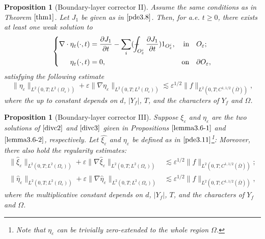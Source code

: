 \documentclass[13pt,CJK]{article}
\theoremstyle{plain}                       %
\newtheorem{proposition}[lemma]{Proposition}
\theoremstyle{remark}
\numberwithin{equation}{section}
\def\Xint#1{\mathchoice
  {\XXint\displaystyle\textstyle{#1}}%
  {\XXint\textstyle\scriptstyle{#1}}%
  {\XXint\scriptstyle\scriptscriptstyle{#1}}%
  {\XXint\scriptscriptstyle\scriptscriptstyle{#1}}%
  \!\int}
\def\XXint#1#2#3{{\setbox0=\hbox{$#1{#2#3}{\int}$}
  \vcenter{\hbox{$#2#3$}}\kern-.5\wd0}}
\def\dashint{\Xint-}
\begin{document}
\begin{proposition}[Boundary-layer corrector II]\label{lemma3.6-2}
Assume the same conditions as in Theorem $\ref{thm1}$.
Let $J_1$ be given as in $\eqref{pde3.8}$. Then,
for a.e. $t\geq 0$,  there exists at least
one weak solution to
\begin{equation}\label{divc3}
\left\{
\begin{aligned}
\nabla\cdot\eta_{\varepsilon}(\cdot,t)&=\frac{\partial J_1}{\partial t} -\sum_{i} (\dashint_{O_{\varepsilon}^i}\frac{\partial J_1}{\partial t})1_{O_{\varepsilon}^i},&
\text{in}&\quad O_{\varepsilon};\\
\eta_{\varepsilon}(\cdot,t)&=0,&\text{on}&\quad \partial O_{\varepsilon},
\end{aligned}\right.
\end{equation}
satisfying the following estimate
\begin{equation}\label{pri:5.2}
 \|\eta_{\varepsilon}\|_{L^2(0,T;L^2(\Omega_\varepsilon))}
 + \varepsilon\|\nabla\eta_{\varepsilon}\|_{L^2(0,T;L^2(\Omega_\varepsilon))}
 \lesssim \varepsilon^{1/2}\|f\|_{L^2(0,T;C^{1,1/2}(\bar{\Omega}))},
\end{equation}
where the up to constant depends on $d$, $|Y_f|$, $T$, and the characters of $Y_f$ and $\Omega$.
\end{proposition}


\begin{proposition}[Boundary-layer corrector III]\label{lemma3.6-3}
Suppose $\xi_{\varepsilon}$ and $\eta_{\varepsilon}$ are the two solutions of $\eqref{divc2}$ and $\eqref{divc3}$ given in Propositions $\ref{lemma3.6-1}$ and $\ref{lemma3.6-2}$, respectively.
Let $\hat{\xi_{\varepsilon}}$ and $\hat{\eta_{\varepsilon}}$ be defined as in $\eqref{pde3.11}$\footnote{Note that
$\eta_{\varepsilon}$ can be trivially zero-extended to the whole region $\Omega$.}:
Moreover, there also hold the regularity estimates:
\begin{subequations}
\begin{align}
\|\hat\xi_{\varepsilon}\|_{L^2(0,T;L^2(\Omega_\varepsilon))}
+ \varepsilon\|\nabla\hat\xi_{\varepsilon}\|_{L^2(0,T;L^2(\Omega_\varepsilon))}
&\lesssim \varepsilon^{1/2}\|f\|_{L^2(0,T;C^{1,1/2}(\bar\Omega))}; \label{pri:5.3a} \\
\|\hat\eta_{\varepsilon}\|_{L^2(0,T;L^2(\Omega_\varepsilon))}
+ \varepsilon\|\nabla\hat\eta_{\varepsilon}\|_{L^2(0,T;L^2(\Omega_\varepsilon))}
&\lesssim \varepsilon^{1/2}\|f\|_{L^2(0,T;C^{1,1/2}(\bar\Omega))}, \label{pri:5.3b}
\end{align}
\end{subequations}
where the multiplicative constant depends on $d$, $|Y_f|$, $T$, and the characters of
$Y_f$ and $\Omega$.
\end{proposition}
\end{document}

